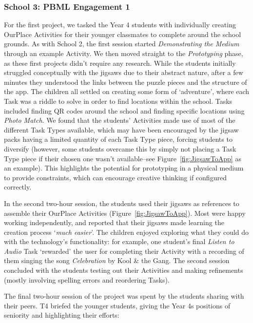 \subsubsection{School 3: PBML Engagement 1}
For the first project, we tasked the Year 4 students with individually creating OurPlace Activities for their younger classmates to complete around the school grounds. As with School 2, the first session started \textit{Demonstrating the Medium} through an example Activity. We then moved straight to the \textit{Prototyping} phase, as these first projects didn't require any research. While the students initially struggled conceptually with the jigsaws due to their abstract nature, after a few minutes they understood the links between the puzzle pieces and the structure of the app. The children all settled on creating some form of `adventure', where each Task was a riddle to solve in order to find locations within the school. Tasks included finding QR codes around the school and finding specific locations using \textit{Photo Match}. We found that the students' Activities made use of most of the different Task Types available, which may have been encouraged by the jigsaw packs having a limited quantity of each Task Type piece, forcing students to diversify (however, some students overcame this by simply not placing a Task Type piece if their chosen one wasn't available--see Figure~\ref{fig:JigsawToApp} as an example). This highlights the potential for prototyping in a physical medium to provide constraints, which can encourage creative thinking if configured correctly.

In the second two-hour session, the students used their jigsaws as references to assemble their OurPlace Activities (Figure~\ref{fig:JigsawToApp}). Most were happy working independently, and reported that their jigsaws made learning the creation process `\textit{much easier}'. The children enjoyed exploring what they could do with the technology's functionality: for example, one student's final \textit{Listen to Audio} Task `rewarded' the user for completing their Activity with a recording of them singing the song \textit{Celebration} by Kool \& the Gang. The second session concluded with the students testing out their Activities and making refinements (mostly involving spelling errors and reordering Tasks). 

The final two-hour session of the project was spent by the students sharing with their peers. T4 briefed the younger students, giving the Year 4s positions of seniority and highlighting their efforts:

